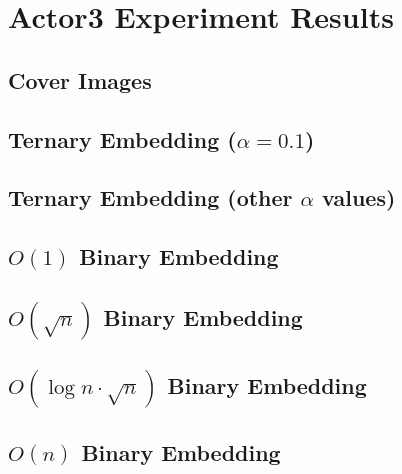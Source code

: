 \documentclass[11pt,a4paper]{report}
\begin{document}
\chapter{Actor3 Experiment Results}
\label{sec:actor3-results}

\section{Cover Images}


\section{Ternary Embedding (\texorpdfstring{$\alpha=0.1$}{alpha})}


\section{Ternary Embedding (other \texorpdfstring{$\alpha$}{alpha} values)}


\newpage
\section{\texorpdfstring{$O(1)$}{O(1)} Binary Embedding}


\newpage
\section{\texorpdfstring{$O(\sqrt{n})$}{O(sqrt(n))} Binary Embedding}


\newpage
\section{\texorpdfstring{$O(\log{n} \cdot \sqrt{n})$}{O(log(n)*sqrt(n))} Binary Embedding}


\newpage
\section{\texorpdfstring{$O(n)$}{O(n)} Binary Embedding}

\end{document}
